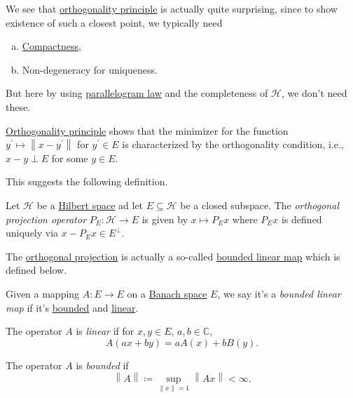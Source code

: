 We see that \hyperref[thm:orthogonality-principle]{orthogonality principle} is actually quite surprising, since to show existence of such a closest point, we typically need
\begin{enumerate}[(a)]
	\item \hyperref[def:compact]{Compactness},
	\item Non-degeneracy for uniqueness.
\end{enumerate}
But here by using \hyperref[lma:parallelogram-law]{parallelogram law} and the completeness of \(\mathcal{H} \), we don't need these.

\begin{remark}
	\hyperref[thm:orthogonality-principle]{Orthogonality principle} shows that the minimizer for the function \(y^\prime \mapsto \left\lVert x - y^\prime \right\rVert \) for \(y^\prime \in E\) is characterized by the orthogonality condition, i.e., \(x - y\perp E\) for some \(y\in E\).
\end{remark}

This suggests the following definition.

\begin{definition}\label{def:orthogonal-projection}
	Let \(\mathcal{H} \) be a \hyperref[def:Hilbert-space]{Hilbert space} ad let \(E\subseteq \mathcal{H} \) be a closed subspace. The \emph{orthogonal projection operator} \(P_E\colon \mathcal{H} \to E\) is given by \(x \mapsto P_E x\) where \(P_E x\) is defined uniquely via \(x - P_E x\in E^\perp\).
\end{definition}

The \hyperref[def:orthogonal-projection]{orthogonal projection} is actually a so-called \hyperref[def:bounded-linear-map]{bounded linear map} which is defined below.

\begin{definition}\label{def:bounded-linear-map}
	Given a mapping \(A\colon E \to E\) on a \hyperref[def:Banach-space]{Banach space} \(E\), we say it's a \emph{bounded linear map} if it's \hyperref[def:bounded-map]{bounded} and \hyperref[def:linear-map]{linear}.

	\begin{definition}\label{def:linear-map}
		The operator \(A\) is \emph{linear} if for \(x, y\in E\), \(a, b\in \mathbb{C} \),
		\[
			A(ax + by) = a A(x) + b B(y).
		\]
	\end{definition}

	\begin{definition}\label{def:bounded-map}
		The operator \(A\) is \emph{bounded} if
		\[
			\left\lVert A\right\rVert \coloneqq \sup _{\left\lVert x\right\rVert = 1} \left\lVert Ax\right\rVert < \infty.
		\]
	\end{definition}
\end{definition}

